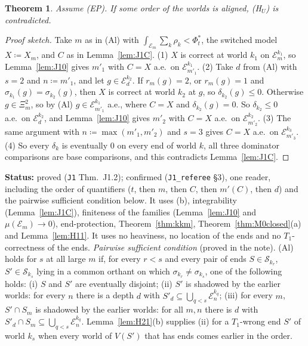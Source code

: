 \documentclass[11pt]{article}
\newtheorem{theorem}{Theorem}[section]
\theoremstyle{definition}
\theoremstyle{remark}
\newcommand{\src}[1]{\texttt{#1}}
\newcommand{\status}[1]{\par\smallskip\noindent\textbf{Status:} #1\par\smallskip}
\begin{document}
\begin{theorem}\label{thm:J12}
Assume (EP). If some order of the worlds is aligned, (H$_U$) is contradicted.
\end{theorem}
\begin{proof}[Proof sketch]
Take $m$ as in (Al) with $\int_{\mathcal E_m}\sum_k\rho_k<\Phi^*_t$, the switched model $X\coloneqq X_m$, and $C$ as in Lemma~\ref{lem:J1C}. (1) $X$ is correct at world $k_1$ on $\mathcal E^{k_1}_m$, so Lemma~\ref{lem:J10} gives $m'_1$ with $C=X$ a.e.\ on $\mathcal E^{k_1}_{m'_1}$. (2) Take $d$ from (Al) with $s=2$ and $n\coloneqq m'_1$, and let $g\in\mathcal E^{k_2}_d$. If $r_m(g)=2$, or $r_m(g)=1$ and $\sigma_{k_1}(g)=\sigma_{k_2}(g)$, then $X$ is correct at world $k_2$ at $g$, so $\delta_{k_2}(g)\le0$. Otherwise $g\in\Xi^2_m$, so by (Al) $g\in\mathcal E^{k_1}_{m'_1}$ a.e., where $C=X$ and $\delta_{k_2}(g)=0$. So $\delta_{k_2}\le0$ a.e.\ on $\mathcal E^{k_2}_d$, and Lemma~\ref{lem:J10} gives $m'_2$ with $C=X$ a.e.\ on $\mathcal E^{k_2}_{m'_2}$. (3) The same argument with $n\coloneqq\max(m'_1,m'_2)$ and $s=3$ gives $C=X$ a.e.\ on $\mathcal E^{k_3}_{m'_3}$. (4) So every $\delta_k$ is eventually $0$ on every end of world $k$, all three dominator comparisons are base comparisons, and this contradicts Lemma~\ref{lem:J1C}.
\end{proof}
\status{proved (\src{J1} Thm.~J1.2); confirmed (\src{J1\_referee} \S3), one reader, including the order of quantifiers ($t$, then $m$, then $C$, then $m'(C)$, then $d$) and the pairwise sufficient condition below. It uses (b), integrability (Lemma~\ref{lem:J1C}), finiteness of the families (Lemma~\ref{lem:J10} and $\mu(\mathcal E_m)\to0$), end-protection, Theorem~\ref{thm:kkm}, Theorem~\ref{thm:M0closed}(a) and Lemma~\ref{lem:H11}. It uses no heaviness, no location of the ends and no $T_1$-correctness of the ends. \emph{Pairwise sufficient condition} (proved in the note). (Al) holds for $s$ at all large $m$ if, for every $r<s$ and every pair of ends $S\in\mathcal S_{k_r}$, $S'\in\mathcal S_{k_s}$ lying in a common orthant on which $\sigma_{k_r}\ne\sigma_{k_s}$, one of the following holds: (i) $S$ and $S'$ are eventually disjoint; (ii) $S'$ is shadowed by the earlier worlds: for every $n$ there is a depth $d$ with $S'_d\subseteq\bigcup_{q<s}\mathcal E^{k_q}_n$; (iii) for every $m$, $S'\cap S_m$ is shadowed by the earlier worlds: for all $m,n$ there is $d$ with $S'_d\cap S_m\subseteq\bigcup_{q<s}\mathcal E^{k_q}_n$. Lemma~\ref{lem:H21}(b) supplies (ii) for a $T_1$-wrong end $S'$ of world $k_s$ when every world of $V(S')$ that has ends comes earlier in the order.}
\end{document}
